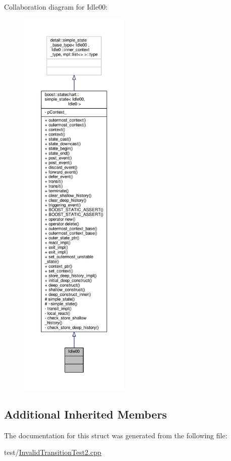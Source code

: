 Collaboration diagram for Idle00\+:
\nopagebreak
\begin{figure}[H]
\begin{center}
\leavevmode
\includegraphics[height=550pt]{struct_idle00__coll__graph}
\end{center}
\end{figure}
\subsection*{Additional Inherited Members}


The documentation for this struct was generated from the following file\+:\begin{DoxyCompactItemize}
\item 
test/\mbox{\hyperlink{_invalid_transition_test2_8cpp}{Invalid\+Transition\+Test2.\+cpp}}\end{DoxyCompactItemize}
